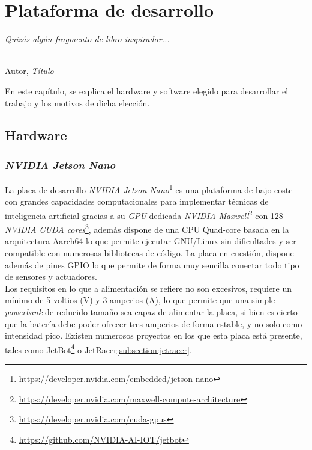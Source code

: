 \chapter{Plataforma de desarrollo}
\label{cap:capitulo3}

\begin{flushright}
	\begin{minipage}[]{10cm}
		\emph{Quizás algún fragmento de libro inspirador...}\\
	\end{minipage}\\

	Autor, \textit{Título}\\
\end{flushright}

\vspace{1cm}

En este capítulo, se explica el hardware y software elegido para desarrollar el trabajo y los motivos de dicha elección.

\section{Hardware}
\subsection{\textit{NVIDIA Jetson Nano}}
La placa de desarrollo \textit{NVIDIA Jetson Nano}\footnote{\url{https://developer.nvidia.com/embedded/jetson-nano}} es una plataforma de bajo coste con grandes capacidades computacionales para implementar técnicas de inteligencia artificial gracias a su \textit{GPU} dedicada \textit{NVIDIA Maxwell}\footnote{\url{https://developer.nvidia.com/maxwell-compute-architecture}} con 128 \textit{NVIDIA CUDA cores}\footnote{\url{https://developer.nvidia.com/cuda-gpus}}, además dispone de una CPU Quad-core basada en la arquitectura Aarch64 lo que permite ejecutar GNU/Linux sin dificultades y ser compatible con numerosas bibliotecas de código. La placa en cuestión, dispone además de pines GPIO lo que permite de forma muy sencilla conectar todo tipo de sensores y actuadores.\\

Los requisitos en lo que a alimentación se refiere no son excesivos, requiere un mínimo de 5 voltios (V) y 3 amperios (A), lo que permite que una simple \textit{powerbank} de reducido tamaño sea capaz de alimentar la placa, si bien es cierto que la batería debe poder ofrecer tres amperios de forma estable, y no solo como intensidad pico. Existen numerosos proyectos en los que esta placa está presente, tales como JetBot\footnote{\url{https://github.com/NVIDIA-AI-IOT/jetbot}} o JetRacer\ref{subsection:jetracer}.\\

